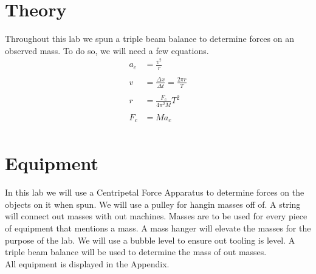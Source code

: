 \documentclass[12pt]{report}
\newcommand{\eqname}[1]{\tag*{#1}}%
\begin{document}
\begin{flushleft}
\begin{multicols}{2}
\section{Theory}
Throughout this lab we spun a triple beam balance to determine forces on an
observed mass. To do so, we will need a few equations.
\begin{align}
  a_c &= \frac{v^2}{r} \label{centripetal_acceleration} \\ \eqname{Centripetal Acceleration} \\
  v &= \frac{\Delta x}{\Delta t} = \frac{2\pi r}{T} \label{velocity} \\ \eqname{Velocity} \\
  r &= \frac{F_c}{4\pi^2M}T^2 \label{radius} \\ \eqname{Radius of Rotation} \\
  F_c &= Ma_c \label{centripetal_force} \\ \eqname{Centripetal Force}
\end{align}
\section{Equipment}
In this lab we will use a Centripetal Force Apparatus to determine forces on the objects on it when spun. We will use a pulley for hangin masses off of. A string will connect out masses with out machines.
Masses are to be used for every piece of equipment that mentions a mass. A mass hanger will elevate the masses for the purpose of the lab. We will use a bubble level to ensure out tooling is level. A triple beam balance will be used to determine the mass of out masses.\\ All equipment is  displayed in the Appendix.

\end{multicols}
\end{flushleft}
\end{document}
